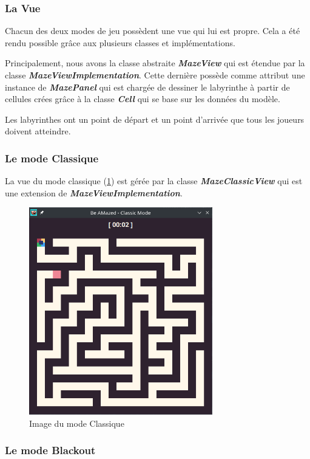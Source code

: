 \subsubsection{La Vue}
\label{subsubsec:vue}

Chacun des deux modes de jeu possèdent une vue qui lui est propre.
Cela a été rendu possible grâce aux plusieurs classes et implémentations.

Principalement, nous avons la classe abstraite \textbf{\textit{MazeView}} qui est étendue par la classe \textbf{\textit{MazeViewImplementation}}.
Cette dernière possède comme attribut une instance de
\textbf{\textit{MazePanel}} qui est chargée de dessiner le labyrinthe à partir de cellules crées grâce à la classe \textbf{\textit{Cell}} qui se base sur les données du modèle.

Les labyrinthes ont un point de départ et un point d'arrivée que tous les joueurs doivent atteindre.
\subsubsection*{Le mode Classique}

La vue du mode classique (\ref{fig:ClassicModeLabyrinth}) est gérée par la classe \textbf{\textit{MazeClassicView}} qui est une extension de \textbf{\textit{MazeViewImplementation}}.

\begin{figure}[!htb]%
    \centering
    \includegraphics[width=8cm]{ressources/Implementation/Labyrinthe/Vue/Classic/Classic.png}%
    \caption{Image du mode Classique}%
    \label{fig:ClassicModeLabyrinth}
\end{figure}
\subsubsection*{Le mode Blackout}

